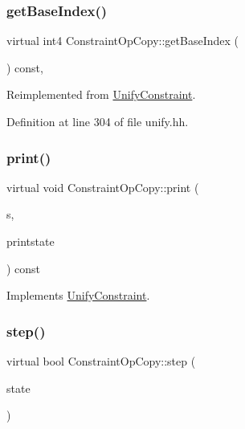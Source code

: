 \subsubsection{\texorpdfstring{getBaseIndex()}{getBaseIndex()}}
{\footnotesize\ttfamily virtual int4 Constraint\+Op\+Copy\+::get\+Base\+Index (\begin{DoxyParamCaption}\item[{void}]{ }\end{DoxyParamCaption}) const\hspace{0.3cm}{\ttfamily [inline]}, {\ttfamily [virtual]}}



Reimplemented from \mbox{\hyperlink{class_unify_constraint_a44f0164f38ac1fdc44fc73ebe7678de1}{Unify\+Constraint}}.



Definition at line 304 of file unify.\+hh.

\mbox{\label{class_constraint_op_copy_afc1b0335d3d29f5405914fb0b43b3418}} 
\subsubsection{\texorpdfstring{print()}{print()}}
{\footnotesize\ttfamily virtual void Constraint\+Op\+Copy\+::print (\begin{DoxyParamCaption}\item[{ostream \&}]{s,  }\item[{\mbox{\hyperlink{class_unify_c_printer}{Unify\+C\+Printer}} \&}]{printstate }\end{DoxyParamCaption}) const\hspace{0.3cm}{\ttfamily [virtual]}}



Implements \mbox{\hyperlink{class_unify_constraint_a774f6a611a96384766cb8e8d8f5ff41f}{Unify\+Constraint}}.

\mbox{\label{class_constraint_op_copy_aae93c891f29b393a21aad701e665f63b}} 
\subsubsection{\texorpdfstring{step()}{step()}}
{\footnotesize\ttfamily virtual bool Constraint\+Op\+Copy\+::step (\begin{DoxyParamCaption}\item[{\mbox{\hyperlink{class_unify_state}{Unify\+State}} \&}]{state }\end{DoxyParamCaption})\hspace{0.3cm}{\ttfamily [virtual]}}



